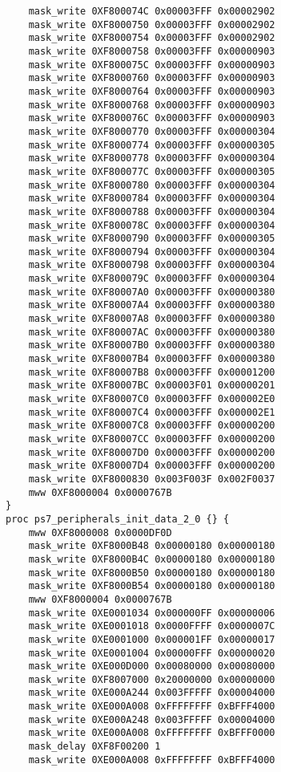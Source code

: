 \begin{lstlisting}
    mask_write 0XF800074C 0x00003FFF 0x00002902
    mask_write 0XF8000750 0x00003FFF 0x00002902
    mask_write 0XF8000754 0x00003FFF 0x00002902
    mask_write 0XF8000758 0x00003FFF 0x00000903
    mask_write 0XF800075C 0x00003FFF 0x00000903
    mask_write 0XF8000760 0x00003FFF 0x00000903
    mask_write 0XF8000764 0x00003FFF 0x00000903
    mask_write 0XF8000768 0x00003FFF 0x00000903
    mask_write 0XF800076C 0x00003FFF 0x00000903
    mask_write 0XF8000770 0x00003FFF 0x00000304
    mask_write 0XF8000774 0x00003FFF 0x00000305
    mask_write 0XF8000778 0x00003FFF 0x00000304
    mask_write 0XF800077C 0x00003FFF 0x00000305
    mask_write 0XF8000780 0x00003FFF 0x00000304
    mask_write 0XF8000784 0x00003FFF 0x00000304
    mask_write 0XF8000788 0x00003FFF 0x00000304
    mask_write 0XF800078C 0x00003FFF 0x00000304
    mask_write 0XF8000790 0x00003FFF 0x00000305
    mask_write 0XF8000794 0x00003FFF 0x00000304
    mask_write 0XF8000798 0x00003FFF 0x00000304
    mask_write 0XF800079C 0x00003FFF 0x00000304
    mask_write 0XF80007A0 0x00003FFF 0x00000380
    mask_write 0XF80007A4 0x00003FFF 0x00000380
    mask_write 0XF80007A8 0x00003FFF 0x00000380
    mask_write 0XF80007AC 0x00003FFF 0x00000380
    mask_write 0XF80007B0 0x00003FFF 0x00000380
    mask_write 0XF80007B4 0x00003FFF 0x00000380
    mask_write 0XF80007B8 0x00003FFF 0x00001200
    mask_write 0XF80007BC 0x00003F01 0x00000201
    mask_write 0XF80007C0 0x00003FFF 0x000002E0
    mask_write 0XF80007C4 0x00003FFF 0x000002E1
    mask_write 0XF80007C8 0x00003FFF 0x00000200
    mask_write 0XF80007CC 0x00003FFF 0x00000200
    mask_write 0XF80007D0 0x00003FFF 0x00000200
    mask_write 0XF80007D4 0x00003FFF 0x00000200
    mask_write 0XF8000830 0x003F003F 0x002F0037
    mww 0XF8000004 0x0000767B
}
proc ps7_peripherals_init_data_2_0 {} {
    mww 0XF8000008 0x0000DF0D
    mask_write 0XF8000B48 0x00000180 0x00000180
    mask_write 0XF8000B4C 0x00000180 0x00000180
    mask_write 0XF8000B50 0x00000180 0x00000180
    mask_write 0XF8000B54 0x00000180 0x00000180
    mww 0XF8000004 0x0000767B
    mask_write 0XE0001034 0x000000FF 0x00000006
    mask_write 0XE0001018 0x0000FFFF 0x0000007C
    mask_write 0XE0001000 0x000001FF 0x00000017
    mask_write 0XE0001004 0x00000FFF 0x00000020
    mask_write 0XE000D000 0x00080000 0x00080000
    mask_write 0XF8007000 0x20000000 0x00000000
    mask_write 0XE000A244 0x003FFFFF 0x00004000
    mask_write 0XE000A008 0xFFFFFFFF 0xBFFF4000
    mask_write 0XE000A248 0x003FFFFF 0x00004000
    mask_write 0XE000A008 0xFFFFFFFF 0xBFFF0000
    mask_delay 0XF8F00200 1
    mask_write 0XE000A008 0xFFFFFFFF 0xBFFF4000

\end{lstlisting}
